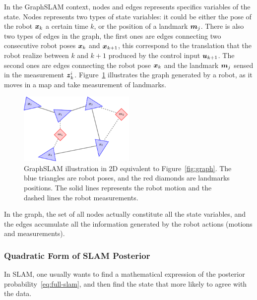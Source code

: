 In the GraphSLAM context, nodes and edges represents specifics variables of the state. Nodes represents two types of state variables: it could be either the pose of the robot $\boldsymbol{x}_k$ a certain time $k$, or the position of a landmark $\boldsymbol{m}_j$. There is also two types of edges in the graph, the first ones are edges connecting two consecutive robot poses $\boldsymbol{x}_k$ and $\boldsymbol{x}_{k+1}$, this correspond to the translation that the robot realize between $k$ and $k+1$ produced by the control input $\boldsymbol{u}_{k+1}$. The second ones are edges connecting the robot pose $\boldsymbol{x}_k$ and the landmark $\boldsymbol{m}_j$ sensed in the measurement $\boldsymbol{z}_k^i$. Figure~\ref{fig:graphslam} illustrates the graph generated by a robot, as it moves in a map and take measurement of landmarks.

\begin{figure}[htbp!]
    \centering
    \includegraphics[width=0.5\textwidth]{tikz/graphslam.pdf}
    \caption[GraphSLAM ilustration in 2D]{GraphSLAM illustration in 2D equivalent to Figure~\ref{fig:graph}. The blue triangles are robot poses, and the red diamonds are landmarks positions. The solid lines represents the robot motion and the dashed lines the robot measurements.}
    \label{fig:graphslam}
\end{figure} 

In the graph, the set of all nodes actually constitute all the state variables, and the edges accumulate all the information generated by the robot actions (motions and measurements).

\subsubsection{Quadratic Form of SLAM Posterior}

In SLAM, one usually wants to find a mathematical expression of the posterior probability~\eqref{eq:full-slam}, and then find the state that more likely to agree with the data.


